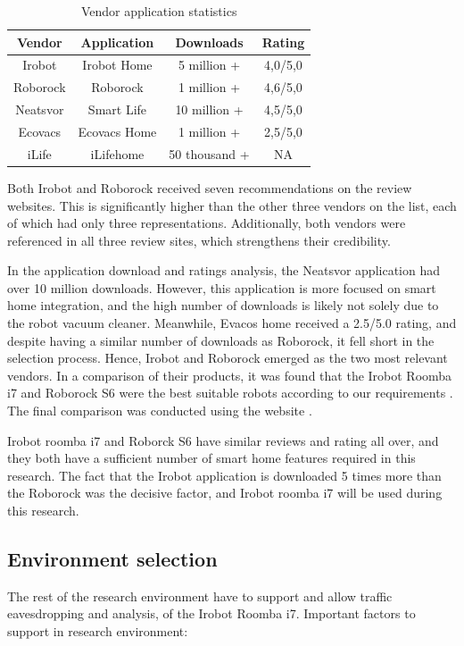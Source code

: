 \begin{table}[H]
\centering
\caption{Vendor application statistics}
\label{tab:VendorApplicationStat}
\begin{tabular}{|c|c|c|c|}
\hline
\textbf{Vendor} & \textbf{Application} & \textbf{Downloads} & \textbf{Rating} \\ \hline
Irobot          & Irobot Home          & 5 million +        & 4,0/5,0         \\ \hline
Roborock        & Roborock             & 1 million +        & 4,6/5,0         \\ \hline
Neatsvor        & Smart Life           & 10 million +       & 4,5/5,0         \\ \hline
Ecovacs         & Ecovacs Home         & 1 million +        & 2,5/5,0         \\ \hline
iLife           & iLifehome            & 50 thousand +      & NA              \\ \hline
\end{tabular}
\end{table}
Both Irobot and Roborock received seven recommendations on the review websites. This is significantly higher than the other three vendors on the list, each of which had only three representations. Additionally, both vendors were referenced in all three review sites, which strengthens their credibility. 

In the application download and ratings analysis, the Neatsvor application had over 10 million downloads. However, this application is more focused on smart home integration, and the high number of downloads is likely not solely due to the robot vacuum cleaner. Meanwhile, Evacos home received a 2.5/5.0 rating, and despite having a similar number of downloads as Roborock, it fell short in the selection process. Hence, Irobot and Roborock emerged as the two most relevant vendors. In a comparison of their products, it was found that the Irobot Roomba i7 and Roborock S6 were the best suitable robots according to our requirements \cite{robotsel8} \cite{robotsel6}. The final comparison was conducted using the website \cite{robotsel9}.

Irobot roomba i7 and Roborck S6 have similar reviews and rating all over, and they both have a sufficient number of smart home features required in this research. The fact that the Irobot application is downloaded 5 times more than the Roborock was the decisive factor, and Irobot roomba i7 will be used during this research. 

\subsection{Environment selection}
The rest of the research environment have to support and allow traffic eavesdropping and analysis, of the Irobot Roomba i7.  Important factors to support in research environment:

